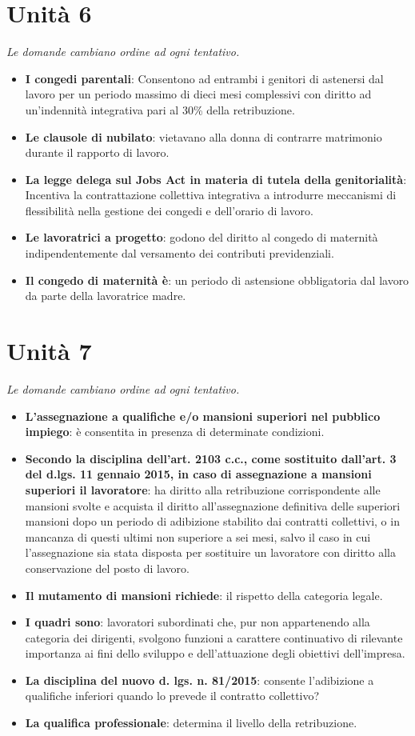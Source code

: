 \documentclass[12pt, a4paper]{report}
\begin{document}
\chapter{Unità 6}
    \textit{Le domande cambiano ordine ad ogni tentativo.}
    \begin{itemize}
        \item \textbf{I congedi parentali}: Consentono ad entrambi i genitori di astenersi dal lavoro per un periodo massimo di dieci mesi complessivi con diritto ad un’indennità integrativa pari al 30\% della retribuzione.
        \item \textbf{Le clausole di nubilato}: vietavano alla donna di contrarre matrimonio durante il rapporto di lavoro.
        \item \textbf{La legge delega sul Jobs Act in materia di tutela della genitorialità}: Incentiva la contrattazione collettiva integrativa a introdurre meccanismi di flessibilità nella gestione dei congedi e dell’orario di lavoro.
        \item \textbf{Le lavoratrici a progetto}: godono del diritto al congedo di maternità indipendentemente dal versamento dei contributi previdenziali.
        \item \textbf{Il congedo di maternità è}: un periodo di astensione obbligatoria dal lavoro da parte della lavoratrice madre.
    \end{itemize}
\chapter{Unità 7}
    \textit{Le domande cambiano ordine ad ogni tentativo.}
    \begin{itemize}
        \item \textbf{L’assegnazione a qualifiche e/o mansioni superiori nel pubblico impiego}: è consentita in presenza di determinate condizioni.
        \item \textbf{Secondo la disciplina dell’art. 2103 c.c., come sostituito dall’art. 3 del d.lgs. 11 gennaio 2015, in caso di assegnazione a mansioni superiori il lavoratore}: ha diritto alla retribuzione corrispondente alle mansioni svolte e acquista il diritto all’assegnazione definitiva delle superiori mansioni dopo un periodo di adibizione stabilito dai contratti collettivi, o in mancanza di questi ultimi non superiore a sei mesi, salvo il caso in cui l’assegnazione sia stata disposta per sostituire un lavoratore con diritto alla conservazione del posto di lavoro.
        \item \textbf{Il mutamento di mansioni richiede}: il rispetto della categoria legale.
        \item \textbf{I quadri sono}: lavoratori subordinati che, pur non appartenendo alla categoria dei dirigenti, svolgono funzioni a carattere continuativo di rilevante importanza ai fini dello sviluppo e dell’attuazione degli obiettivi dell’impresa.
        \item \textbf{La disciplina del nuovo d. lgs. n. 81/2015}: consente l’adibizione a qualifiche inferiori quando lo prevede il contratto collettivo?
        \item \textbf{La qualifica professionale}: determina il livello della retribuzione.
    \end{itemize}
\end{document}
